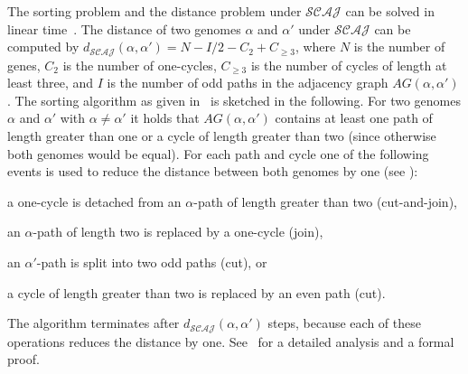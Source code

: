 \documentclass{svmult}
\newcommand{\m}[1]{\mathcal{#1}}
\begin{document}
The sorting problem and the distance problem under $\m{SCAJ}$ can be solved in linear
time~\cite{Bergeron_2010}. The distance of two genomes $\alpha$ and $\alpha'$ 
under $\m{SCAJ}$ can be computed by $d_{\m{SCAJ}}(\alpha,\alpha')= N - I/2 - C_2
+ C_{\geq3}$, where $N$ is the number of genes, $C_2$ is the number of
one-cycles, $C_{\geq 3}$ is the number of cycles of length at least three, and
$I$ is the number of odd paths in the adjacency graph $AG(\alpha,\alpha')$.
The sorting algorithm as given in~\cite{Bergeron_2010} is sketched in the following. For two genomes $\alpha$ and $\alpha'$ with $\alpha
\neq \alpha'$ it holds that $AG(\alpha,\alpha')$ contains at least one path of
length greater than one or a cycle of length greater than two (since otherwise both genomes would be equal). For each path and cycle one of the following events is used to reduce the distance 
between both genomes by one (see ):
\begin{inparaenum}[a)]
	\item a one-cycle is detached from an $\alpha$-path of length
	greater than two (cut-and-join),
	\item an $\alpha$-path of length two is replaced by a one-cycle
	(join),
	\item an $\alpha'$-path is split into two odd paths (cut), or
	\item a cycle of length greater than two is replaced by an even
	path (cut).
\end{inparaenum}
The algorithm terminates after $d_{\m{SCAJ}}(\alpha,\alpha')$ steps, because each of these operations reduces the distance by one. 
See~\cite{Bergeron_2010} for a detailed analysis and a formal proof.
\end{document}
